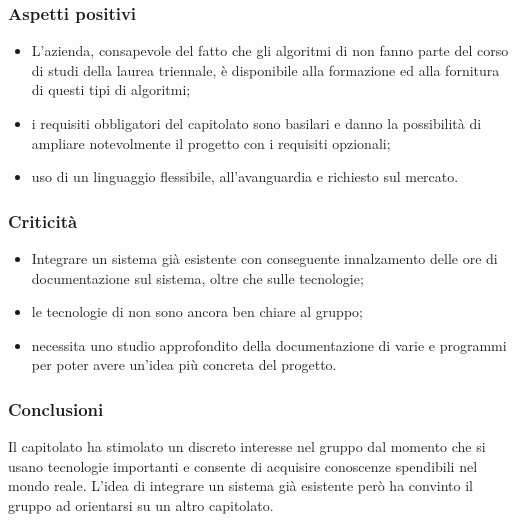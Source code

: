 		\subsubsection{Aspetti positivi}
			\begin{itemize}
			  \item L’azienda, consapevole del fatto che gli algoritmi di  non fanno parte del corso di studi della laurea triennale, è disponibile alla formazione ed alla fornitura di questi tipi di algoritmi;
			  \item i requisiti obbligatori del capitolato sono basilari e danno la possibilità di ampliare notevolmente il progetto con i requisiti opzionali;
			  \item uso di un linguaggio flessibile, all'avanguardia e richiesto sul mercato.
			\end{itemize}

		\subsubsection{Criticità}
			\begin{itemize}
				\item Integrare un sistema già esistente con conseguente innalzamento delle ore di documentazione sul sistema, oltre che sulle tecnologie;
				\item le tecnologie di  non sono ancora ben chiare al gruppo;
				\item necessita uno studio approfondito della documentazione di varie  e programmi per poter avere un'idea più concreta del progetto.
			\end{itemize}

		\subsubsection{Conclusioni}
			Il capitolato ha stimolato un discreto interesse nel gruppo dal momento che si usano tecnologie importanti e consente di acquisire conoscenze spendibili nel mondo reale. L'idea di integrare un sistema già esistente però ha convinto il gruppo ad orientarsi su un altro capitolato.
